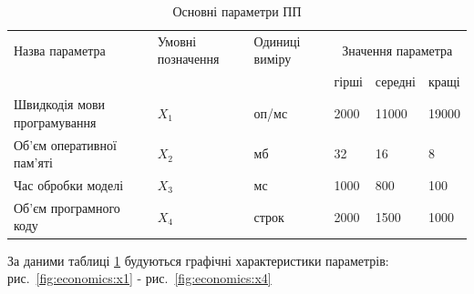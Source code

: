 \begin{table}[ht]
	\caption{Основні параметри ПП}
	\centering
\begin{tabular}{|p{}|p{}|p{}|p{}|p{}|p{}|}
	\hline
	Назва параметра & Умовні позначення & Одиниці виміру & \multicolumn{3}{c|}{Значення параметра} \\ \cline{4-6}
	& & & гірші & середні & кращі \\
	\hline	
	Швидкодія мови програмування & $X_1$ & оп/мс & 2000 & 11000 & 19000 \\ 
	\hline
	Об'єм оперативної пам'яті & $X_2$ & мб & 32 & 16 & 8 \\
	\hline
	Час обробки моделі & $X_3$ & мс & 1000 & 800 & 100  \\
	\hline
	Об'єм програмного коду & $X_4$ & строк & 2000 &1500& 1000 \\
	\hline
\end{tabular}	
	\label{tab:economics_program_parameters}
\end{table}

За даними таблиці \ref{tab:economics_program_parameters} будуються графічні характеристики параметрів: рис.~\ref{fig:economics:x1} - рис.~\ref{fig:economics:x4} 


